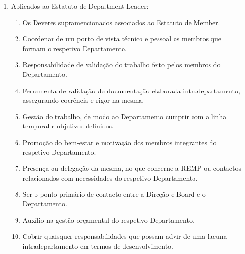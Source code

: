 \begin{enumerate}
\begin{enumerate}
    \item Aplicados ao Estatuto de Department Leader:
    \begin{enumerate}
      \item Os Deveres supramencionados associados ao Estatuto de Member.
      \item Coordenar de um ponto de vista técnico e pessoal os membros que formam o respetivo Departamento.
      \item Responsabilidade de validação do trabalho feito pelos membros do Departamento.
      \item Ferramenta de validação da documentação elaborada intradepartamento, assegurando coerência e rigor na mesma.
      \item Gestão do trabalho, de modo ao Departamento cumprir com a linha temporal e objetivos definidos.
      \item Promoção do bem-estar e motivação dos membros integrantes do respetivo Departamento.
      \item Presença ou delegação da mesma, no que concerne a REMP ou contactos relacionados com necessidades do respetivo Departamento.
      \item Ser o ponto primário de contacto entre a Direção e Board e o Departamento.
      \item Auxílio na gestão orçamental do respetivo Departamento.
      \item Cobrir quaisquer responsabilidades que possam advir de uma lacuna intradepartamento em termos de desenvolvimento.
    \end{enumerate}


\end{enumerate}
\end{enumerate}
